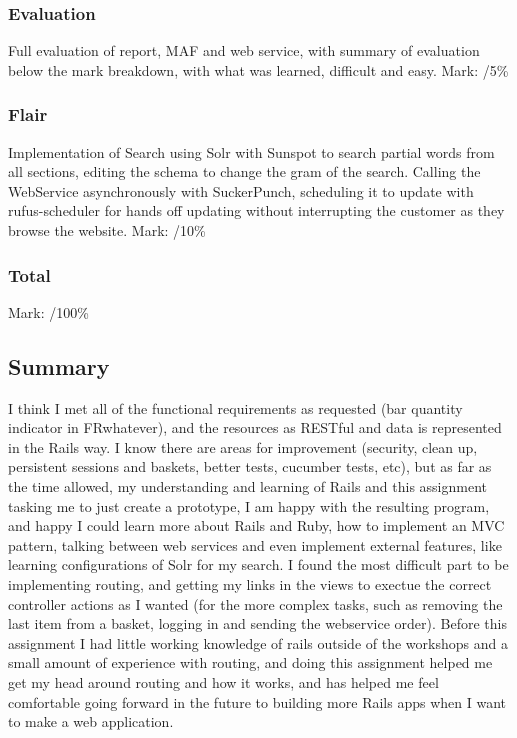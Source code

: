 \documentclass[12pt]{article}
\begin{document}
\subsubsection{Evaluation}
Full evaluation of report, MAF and web service, with summary of evaluation below the mark breakdown, with what was learned, difficult and easy.
Mark: /5\%

\subsubsection{Flair}
Implementation of Search using Solr with Sunspot to search partial words from all sections, editing the schema to change the gram of the search. Calling the WebService asynchronously with SuckerPunch, scheduling it to update with rufus-scheduler for hands off updating without interrupting the customer as they browse the website.
Mark: /10\%

\subsubsection{Total}
Mark: /100\%

\subsection{Summary}
I think I met all of the functional requirements as requested (bar quantity indicator in FRwhatever), and the resources as RESTful and data is represented in the Rails way. I know there are areas for improvement (security, clean up, persistent sessions and baskets, better tests, cucumber tests, etc), but as far as the time allowed, my understanding and learning of Rails and this assignment tasking me to just create a prototype, I am happy with the resulting program, and happy I could learn more about Rails and Ruby, how to implement an MVC pattern, talking between web services and even implement external features, like learning configurations of Solr for my search.
I found the most difficult part to be implementing routing, and getting my links in the views to exectue the correct controller actions as I wanted (for the more complex tasks, such as removing the last item from a basket, logging in and sending the webservice order). Before this assignment I had little working knowledge of rails outside of the workshops and a small amount of experience with routing, and doing this assignment helped me get my head around routing and how it works, and has helped me feel comfortable going forward in the future to building more Rails apps when I want to make a web application. 
\end{document}
